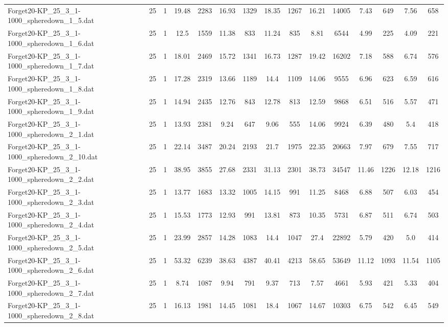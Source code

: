 \begin{table}[!ht]
{\begin{tabular}{lcccccccccccccc}
Forget20-KP\_25\_3\_1-1000\_spheredown\_1\_5.dat & 25 & 1 & 19.48 & 2283 & 16.93 & 1329 & 18.35 & 1267 & 16.21 & 14005 & 7.43 & 649 & 7.56 & 658 \\
Forget20-KP\_25\_3\_1-1000\_spheredown\_1\_6.dat & 25 & 1 & 12.5 & 1559 & 11.38 & 833 & 11.24 & 835 & 8.81 & 6544 & 4.99 & 225 & 4.09 & 221 \\
Forget20-KP\_25\_3\_1-1000\_spheredown\_1\_7.dat & 25 & 1 & 18.01 & 2469 & 15.72 & 1341 & 16.73 & 1287 & 19.42 & 16202 & 7.18 & 588 & 6.74 & 576 \\
Forget20-KP\_25\_3\_1-1000\_spheredown\_1\_8.dat & 25 & 1 & 17.28 & 2319 & 13.66 & 1189 & 14.4 & 1109 & 14.06 & 9555 & 6.96 & 623 & 6.59 & 616 \\
Forget20-KP\_25\_3\_1-1000\_spheredown\_1\_9.dat & 25 & 1 & 14.94 & 2435 & 12.76 & 843 & 12.78 & 813 & 12.59 & 9868 & 6.51 & 516 & 5.57 & 471 \\
Forget20-KP\_25\_3\_1-1000\_spheredown\_2\_1.dat & 25 & 1 & 13.93 & 2381 & 9.24 & 647 & 9.06 & 555 & 14.06 & 9924 & 6.39 & 480 & 5.4 & 418 \\
Forget20-KP\_25\_3\_1-1000\_spheredown\_2\_10.dat & 25 & 1 & 22.14 & 3487 & 20.24 & 2193 & 21.7 & 1975 & 22.35 & 20663 & 7.97 & 679 & 7.55 & 717 \\
Forget20-KP\_25\_3\_1-1000\_spheredown\_2\_2.dat & 25 & 1 & 38.95 & 3855 & 27.68 & 2331 & 31.13 & 2301 & 38.73 & 34547 & 11.46 & 1226 & 12.18 & 1216 \\
Forget20-KP\_25\_3\_1-1000\_spheredown\_2\_3.dat & 25 & 1 & 13.77 & 1683 & 13.32 & 1005 & 14.15 & 991 & 11.25 & 8468 & 6.88 & 507 & 6.03 & 454 \\
Forget20-KP\_25\_3\_1-1000\_spheredown\_2\_4.dat & 25 & 1 & 15.53 & 1773 & 12.93 & 991 & 13.81 & 873 & 10.35 & 5731 & 6.87 & 511 & 6.74 & 503 \\
Forget20-KP\_25\_3\_1-1000\_spheredown\_2\_5.dat & 25 & 1 & 23.99 & 2857 & 14.28 & 1083 & 14.4 & 1047 & 27.4 & 22892 & 5.79 & 420 & 5.0 & 414 \\
Forget20-KP\_25\_3\_1-1000\_spheredown\_2\_6.dat & 25 & 1 & 53.32 & 6239 & 38.63 & 4387 & 40.41 & 4213 & 58.65 & 53649 & 11.12 & 1093 & 11.54 & 1105 \\
Forget20-KP\_25\_3\_1-1000\_spheredown\_2\_7.dat & 25 & 1 & 8.74 & 1087 & 9.94 & 791 & 9.37 & 713 & 7.57 & 4661 & 5.93 & 421 & 5.33 & 404 \\
Forget20-KP\_25\_3\_1-1000\_spheredown\_2\_8.dat & 25 & 1 & 16.13 & 1981 & 14.45 & 1081 & 18.4 & 1067 & 14.67 & 10303 & 6.75 & 542 & 6.45 & 549 \\

\end{tabular}}
\end{table}
